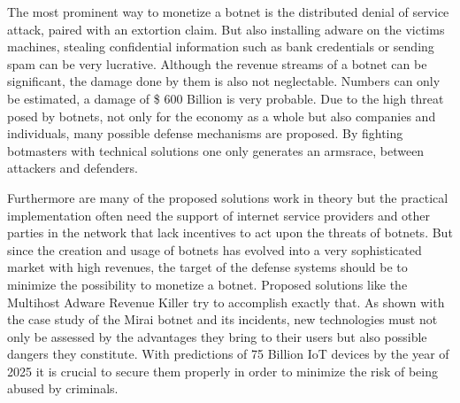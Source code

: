 The most prominent way to monetize a botnet is the distributed denial of service attack, paired with an extortion claim. 
But also installing adware on the victims machines, stealing confidential information such as bank credentials or sending spam can be very lucrative. 
Although the revenue streams of a botnet can be significant, the damage done by them is also not neglectable. 
Numbers can only be estimated, a damage of \$ 600 Billion is very probable. 
Due to the high threat posed by botnets, not only for the economy as a whole but also companies and individuals, many possible defense mechanisms are proposed. 
By fighting botmasters with technical solutions one only generates an armsrace, between attackers and defenders. 

Furthermore are many of the proposed solutions work in theory but the practical implementation often need the support of internet service providers and other parties in the network that lack incentives to act upon the threats of botnets. 
But since the creation and usage of botnets has evolved into a very sophisticated market with high revenues, the target of the defense systems should be to minimize the possibility to monetize a botnet. 
Proposed solutions like the Multihost Adware Revenue Killer try to accomplish exactly that. 
As shown with the case study of the Mirai botnet and its incidents, new technologies must not only be assessed by the advantages they bring to their users but also possible dangers they constitute. 
With predictions of 75 Billion IoT devices by the year of 2025 it is crucial to secure them properly in order to minimize the risk of being abused by criminals. 

